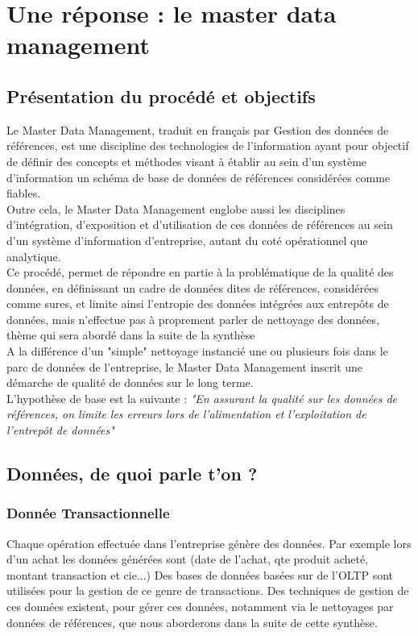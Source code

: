 \section{Une réponse : le master data management}

\subsection{Présentation du procédé et objectifs} 

Le Master Data Management, traduit en français par Gestion des données de références, est une discipline des technologies de l'information ayant pour objectif de définir des concepts et méthodes visant à établir au sein d'un système d'information un schéma de base de données de références considérées comme fiables.\\
Outre cela, le Master Data Management englobe aussi les disciplines d'intégration, d'exposition et d'utilisation de ces données de références au sein d'un système d'information d'entreprise, autant du coté opérationnel que analytique.\\
Ce procédé, permet de répondre en partie à la problématique de la qualité des données, en définissant un cadre de données dites de références, considérées comme sures, et limite ainsi l'entropie des données intégrées aux entrepôts de données, mais n'effectue pas à proprement parler de nettoyage des données, thème qui sera abordé dans la suite de la synthèse\\
A la différence d'un "simple" nettoyage instancié une ou plusieurs fois dans le parc de données de l'entreprise, le Master Data Management inscrit une démarche de qualité de données sur le long terme.\\

L'hypothèse de base est la suivante : \textit{"En assurant la qualité sur les données de références, on limite les erreurs lors de l'alimentation et l'exploitation de l'entrepôt de données"}\\

\subsection{Données, de quoi parle t'on ?}

\subsubsection{Donnée Transactionnelle}

Chaque opération effectuée dans l'entreprise génère des données. Par exemple lors d'un achat
les données générées sont (date de l'achat, qte produit acheté, montant transaction et cie...)
Des bases de données basées sur de l'OLTP sont utilisées pour la gestion de ce genre de transactions.
Des techniques de gestion de ces données existent, pour gérer ces données, notamment via le nettoyages par données de références, que nous aborderons dans la suite de cette synthèse.

